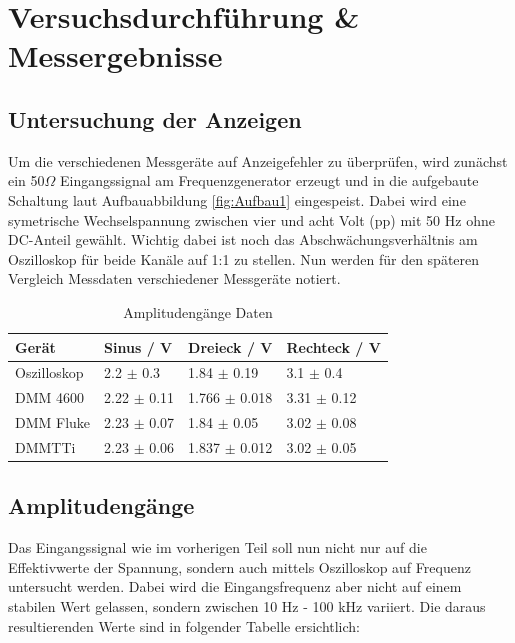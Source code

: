 \documentclass[12pt,a4paper,twoside]{article}
\begin{document}
\section{Versuchsdurchführung \& Messergebnisse} %


\subsection{Untersuchung der Anzeigen}

Um die verschiedenen Messgeräte auf Anzeigefehler zu überprüfen, wird zunächst ein 50$\Omega$ Eingangssignal am Frequenzgenerator erzeugt und in die aufgebaute Schaltung laut Aufbauabbildung \ref{fig:Aufbau1} eingespeist.
Dabei wird eine symetrische Wechselspannung zwischen vier und acht Volt (pp) mit 50 Hz ohne DC-Anteil gewählt. Wichtig dabei ist noch das Abschwächungsverhältnis am Oszilloskop für beide Kanäle auf 1:1 zu stellen. Nun werden für den späteren Vergleich Messdaten verschiedener Messgeräte notiert.

\begin{table}[H]
    \centering
    \caption{Amplitudengänge Daten}
    \label{tab:Daten1}
    \begin{tabular}{| l | l | l | l |}
        \hline
        Gerät   & Sinus / V  & Dreieck / V & Rechteck / V \\
        \hline
        Oszilloskop & 2.2 $\pm$ 0.3  & 1.84 $\pm$ 0.19  & 3.1 $\pm$ 0.4 \\
        DMM 4600    & 2.22 $\pm$ 0.11 & 1.766 $\pm$ 0.018 & 3.31 $\pm$ 0.12 \\
        DMM Fluke   & 2.23 $\pm$ 0.07 & 1.84 $\pm$ 0.05 & 3.02 $\pm$ 0.08 \\
        DMMTTi      & 2.23 $\pm$ 0.06 & 1.837 $\pm$ 0.012 & 3.02 $\pm$ 0.05 \\
        \hline
    \end{tabular}
\end{table}


\subsection{Amplitudengänge}

Das Eingangssignal wie im vorherigen Teil soll nun nicht nur auf die Effektivwerte der Spannung, sondern auch mittels Oszilloskop auf Frequenz untersucht werden.
Dabei wird die Eingangsfrequenz aber nicht auf einem stabilen Wert gelassen, sondern zwischen 10 Hz - 100 kHz variiert. 
Die daraus resultierenden Werte sind in folgender Tabelle ersichtlich:
\end{document}
